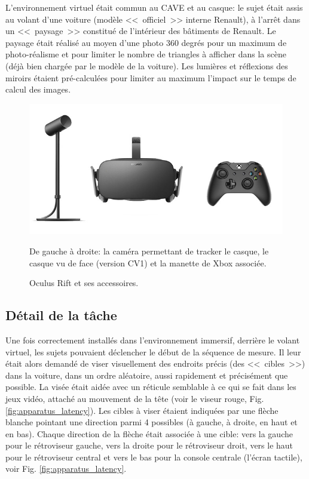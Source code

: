 	\par L'environnement virtuel était commun au CAVE et au casque: le sujet était assis au volant d'une voiture (modèle <<~officiel~>> interne Renault), à l'arrêt dans un <<~paysage~>> constitué de l'intérieur des bâtiments de Renault. Le paysage était réalisé au moyen d'une photo 360 degrés pour un maximum de photo-réalisme et pour limiter le nombre de triangles à afficher dans la scène (déjà bien chargée par le modèle de la voiture). Les lumières et réflexions des miroirs étaient pré-calculées pour limiter au maximum l'impact sur le temps de calcul des images.
	
	\begin{figure}
		\centering
		\includegraphics[scale=.65]{Figures/OculusRift}
		\caption{Oculus Rift et ses accessoires.}{De gauche à droite: la caméra permettant de tracker le casque, le casque vu de face (version CV1) et la manette de Xbox associée.}
		\label{fig:oculus_rift}
	\end{figure}
	
	\subsection{Détail de la tâche}	
	\par Une fois correctement installés dans l'environnement immersif, derrière le volant virtuel, les sujets pouvaient déclencher le début de la séquence de mesure. Il leur était alors demandé de viser visuellement des endroits précis (des <<~cibles~>>) dans la voiture, dans un ordre aléatoire, aussi rapidement et précisément que possible. La visée était aidée avec un réticule semblable à ce qui se fait dans les jeux vidéo, attaché au mouvement de la tête (voir le viseur rouge, Fig. \ref{fig:apparatus_latency}). Les cibles à viser étaient indiquées par une flèche blanche pointant une direction parmi 4 possibles (à gauche, à droite, en haut et en bas). Chaque direction de la flèche était associée à une cible: vers la gauche pour le rétroviseur gauche, vers la droite pour le rétroviseur droit, vers le haut pour le rétroviseur central et vers le bas pour la console centrale (l'écran tactile), voir Fig. \ref{fig:apparatus_latency}.
	
